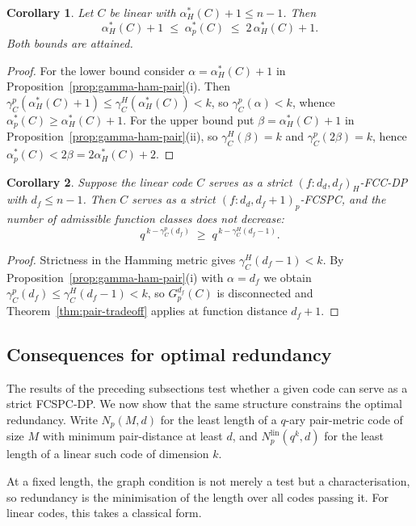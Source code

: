 \documentclass[11pt,draftclsnofoot,journal,onecolumn]{IEEEtran}
\newtheorem{corollary}{Corollary}
\begin{document}
    \begin{corollary}\label{cor:threshold-sandwich}
    Let $C$ be linear with $\alpha^{*}_H(C)+1\le n-1$. Then
    \[
        \alpha^{*}_H(C)+1\;\le\;\alpha^{*}_p(C)\;\le\;2\,\alpha^{*}_H(C)+1 .
    \]
    Both bounds are attained.
    \end{corollary}
    \begin{proof}
    For the lower bound consider $\alpha=\alpha^{*}_H(C)+1$ in Proposition~\ref{prop:gamma-ham-pair}(i). Then $\gamma_C^p(\alpha^{*}_H(C)+1) \leq \gamma^{H}_C(\alpha^{*}_H(C))<k$, so $\gamma^{p}_C(\alpha)<k$, whence $\alpha^{*}_p(C)\ge \alpha^{*}_H(C)+1$. For the upper bound put $\beta=\alpha^{*}_H(C)+1$ in Proposition~\ref{prop:gamma-ham-pair}(ii), so $\gamma^{H}_C(\beta)=k$ and  $\gamma^{p}_C(2\beta)=k$, hence
    $\alpha^{*}_p(C)<2\beta=2\alpha^{*}_H(C)+2$.
    \end{proof}

    \begin{corollary}\label{cor:strictness-transfer}
Suppose the linear code $C$ serves as a strict $(f:d_d,d_f)_H$-FCC-DP with
$d_f\le n-1$. Then $C$ serves as a strict $(f:d_d,d_f+1)_p$-FCSPC, and the
number of admissible function classes does not decrease:
\[
  q^{\,k-\gamma^{p}_C(d_f)}\;\ge\;q^{\,k-\gamma^{H}_C(d_f-1)} .
\]
\end{corollary}
    \begin{proof}
    Strictness in the Hamming metric gives $\gamma^{H}_C(d_f-1)<k$. By Proposition~\ref{prop:gamma-ham-pair}(i) with $\alpha=d_f$ we obtain $\gamma^{p}_C(d_f)\le\gamma^{H}_C(d_f-1)<k$, so $G^{d_f}_p(C)$ is disconnected and Theorem~\ref{thm:pair-tradeoff} applies at function distance $d_f+1$. 
    \end{proof}
        
    

    \subsection{Consequences for optimal redundancy}

    The results of the preceding subsections test whether a given code can serve as a strict FCSPC-DP. We now show that the same structure constrains the optimal redundancy. Write $N_p(M,d)$ for the least length of a $q$-ary pair-metric code of size $M$ with minimum pair-distance at least $d$, and $N_p^{\mathrm{lin}}(q^k,d)$ for the least length of a linear such code of dimension $k$.

    At a fixed length, the graph condition is not merely a test but a characterisation, so redundancy is the minimisation of the length over all codes passing it. For linear codes, this takes a classical form.
\end{document}
